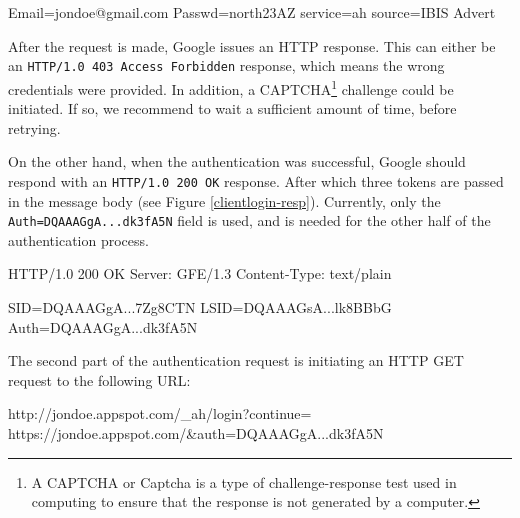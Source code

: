 \begin{figure*}[ht] %
\begin{center}
\begin{code}
Email=jondoe@gmail.com
Passwd=north23AZ
service=ah
source=IBIS Advert
\end{code}
\caption{Authentication Data for ClientLogin.\label{clientlogin-req}}
\end{center}
\end{figure*}

After the request is made, Google issues an HTTP response. This can either be
an \texttt{HTTP/1.0 403 Access Forbidden} response, which means the wrong
credentials were provided. In addition, a CAPTCHA\footnote{A CAPTCHA or Captcha
is a type of challenge-response test used in computing to ensure that the
response is not generated by a computer.} challenge could be initiated. If so,
we recommend to wait a sufficient amount of time, before retrying.

On the other hand, when the authentication was successful, Google should respond
with an \texttt{HTTP/1.0 200 OK} response. After which three tokens are passed
in the message body (see Figure \ref{clientlogin-resp}). Currently, only the
\texttt{Auth=DQAAAGgA...dk3fA5N} field is used, and is needed for the other
half of the authentication process.

\begin{figure*}[ht] %
\begin{center}
\begin{code}
HTTP/1.0 200 OK
Server: GFE/1.3
Content-Type: text/plain

SID=DQAAAGgA...7Zg8CTN
LSID=DQAAAGsA...lk8BBbG
Auth=DQAAAGgA...dk3fA5N
\end{code}
\caption{ClientLogin Response.\label{clientlogin-resp}}
\end{center}
\end{figure*}

The second part of the authentication request is initiating an HTTP GET request
to the following URL:

\begin{center}
\begin{code}
http://jondoe.appspot.com/_ah/login?continue=
    https://jondoe.appspot.com/&auth=DQAAAGgA...dk3fA5N
\end{code}
\end{center}

